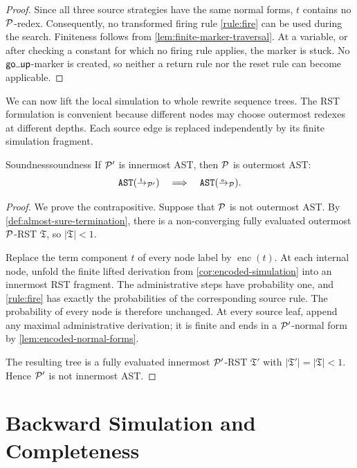 \begin{proof}
  Since all three source strategies have the same normal forms,
  \(t\) contains no \(\P\)-redex.  Consequently, no transformed firing rule
  \eqref{rule:fire} can be used during the search.  Finiteness follows from
  \cref{lem:finite-marker-traversal}.  At a variable, or
  after checking a constant for which no firing rule applies, the marker is
  stuck.  No \(\tgoup\)-marker is created, so neither a return rule nor the
  reset rule can become applicable.
\end{proof}

We can now lift the local simulation to whole rewrite sequence trees.  The RST
formulation is convenient because different nodes may choose outermost redexes
at different depths.  Each source edge is replaced independently by its finite
simulation fragment.

\begin{Theorem}{Soundness}{soundness}
  If \(\P'\) is innermost AST, then \(\P\) is outermost AST:
  \[
    \AST[\ito_{\P'}]\quad\Longrightarrow\quad\AST[\oto_{\P}].
  \]
\end{Theorem}

\begin{proof}
  We prove the contrapositive.  Suppose that \(\P\) is not outermost AST.
  By \cref{def:almost-sure-termination}, there is a non-converging fully
  evaluated outermost \(\P\)-RST \(\mathfrak T\), so
  \(|\mathfrak T|<1\).

  Replace the term component \(t\) of every node label by
  \(\operatorname{enc}(t)\).  At each internal node, unfold the finite lifted
  derivation from \cref{cor:encoded-simulation} into an innermost RST fragment.
  The administrative steps have
  probability one, and \eqref{rule:fire} has exactly the probabilities of the
  corresponding source rule.  The probability of every node is therefore
  unchanged.  At every source leaf, append any maximal administrative
  derivation; it is finite and ends in a \(\P'\)-normal form by
  \cref{lem:encoded-normal-forms}.

  The resulting tree is a fully evaluated innermost \(\P'\)-RST
  \(\mathfrak T'\) with
  \(|\mathfrak T'|=|\mathfrak T|<1\).  Hence \(\P'\) is not innermost AST.
\end{proof}

\section{Backward Simulation and Completeness}
\label{sec:backward-simulation}

